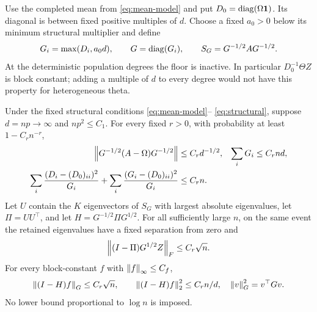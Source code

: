 Use the completed mean from \eqref{eq:mean-model} and put
$D_0=\operatorname{diag}(\Omega\mathbf 1)$. Its diagonal is between fixed positive
multiples of $d$. Choose a fixed $a_0>0$ below its minimum structural
multiplier and define
\[
 G_i=\max(D_i,a_0d),\qquad G=\operatorname{diag}(G_i),\qquad
 S_G=G^{-1/2}AG^{-1/2}.
\]
At the deterministic population degrees the floor is inactive.
In particular $D_0^{-1}\Theta Z$ is block constant; adding a multiple
of $d$ to every degree would not have this property for heterogeneous
theta.

\begin{proposition}\label{prop:sparse-floor}
Under the fixed structural conditions \eqref{eq:mean-model}--%
\eqref{eq:structural}, suppose $d=np\to\infty$ and $np^2\le C_1$.
For every fixed $r>0$, with probability at least $1-C_rn^{-r}$,
\begin{align}
 \left\lVert G^{-1/2}(A-\Omega)G^{-1/2}\right\rVert&\le C_r d^{-1/2},
 &\sum_iG_i&\le C_rnd,\label{eq:floor-noise}\\
 \sum_i\frac{(D_i-(D_0)_{ii})^2}{G_i}
 +\sum_i\frac{(G_i-(D_0)_{ii})^2}{G_i}
 &\le C_rn.\label{eq:floor-degree-energy}
\end{align}
Let $U$ contain the $K$ eigenvectors of $S_G$ with largest absolute
eigenvalues, let $\Pi=UU^\top$, and let
$H=G^{-1/2}\Pi G^{1/2}$. For all sufficiently large $n$, on the same
event the retained eigenvalues have a fixed separation from zero and
\begin{equation}\label{eq:floor-block-residual}
 \left\lVert(I-\Pi)G^{1/2}Z\right\rVert_F\le C_r\sqrt n.
\end{equation}
For every block-constant $f$ with $\left\lVert f\right\rVert_\infty\le C_f$,
\begin{equation}\label{eq:floor-weighted-errors}
 \left\lVert(I-H)f\right\rVert_G\le C_r\sqrt n,\qquad
 \left\lVert(I-H)f\right\rVert_2^2\le C_rn/d,
 \quad \left\lVert v\right\rVert_G^2=v^\top Gv.
\end{equation}
No lower bound proportional to $\log n$ is imposed.
\end{proposition}


